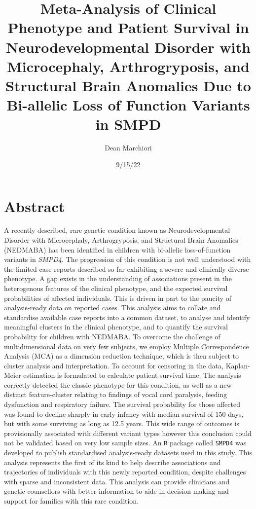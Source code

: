 \documentclass[
  letterpaper,
  DIV=11,
  numbers=noendperiod]{scrartcl}
\title{Meta-Analysis of Clinical Phenotype and Patient Survival in
Neurodevelopmental Disorder with Microcephaly, Arthrogryposis, and
Structural Brain Anomalies Due to Bi-allelic Loss of Function Variants
in SMPD}
\author{Dean Marchiori}
\date{9/15/22}
\begin{document}
\maketitle
\ifdefined\Shaded\renewenvironment{Shaded}{\begin{tcolorbox}[breakable, frame hidden, sharp corners, boxrule=0pt, interior hidden, enhanced, borderline west={3pt}{0pt}{shadecolor}]}{\end{tcolorbox}}\fi

\hypertarget{abstract}{%
\section{Abstract}\label{abstract}}

A recently described, rare genetic condition known as Neurodevelopmental
Disorder with Microcephaly, Arthrogryposis, and Structural Brain
Anomalies (NEDMABA) has been identified in children with bi-allelic
loss-of-function variants in \emph{SMPD4}. The progression of this
condition is not well understood with the limited case reports described
so far exhibiting a severe and clinically diverse phenotype. A gap
exists in the understanding of associations present in the heterogenous
features of the clinical phenotype, and the expected survival
probabilities of affected individuals. This is driven in part to the
paucity of analysis-ready data on reported cases. This analysis aims to
collate and standardise available case reports into a common dataset, to
analyse and identify meaningful clusters in the clinical phenotype, and
to quantify the survival probability for children with NEDMABA. To
overcome the challenge of multidimensional data on very few subjects, we
employ Multiple Correspondence Analysis (MCA) as a dimension reduction
technique, which is then subject to cluster analysis and interpretation.
To account for censoring in the data, Kaplan-Meier estimation is
formulated to calculate patient survival time. The analysis correctly
detected the classic phenotype for this condition, as well as a new
distinct feature-cluster relating to findings of vocal cord paralysis,
feeding dysfunction and respiratory failure. The survival probability
for those affected was found to decline sharply in early infancy with
median survival of 150 days, but with some surviving as long as 12.5
years. This wide range of outcomes is provisionally associated with
different variant types however this conclusion could not be validated
based on very low sample sizes. An \texttt{R} package called
\texttt{SMPD4} was developed to publish standardised analysis-ready
datasets used in this study. This analysis represents the first of its
kind to help describe associations and trajectories of individuals with
this newly reported condition, despite challenges with sparse and
inconsistent data. This analysis can provide clinicians and genetic
counsellors with better information to aide in decision making and
support for families with this rare condition.
\end{document}
